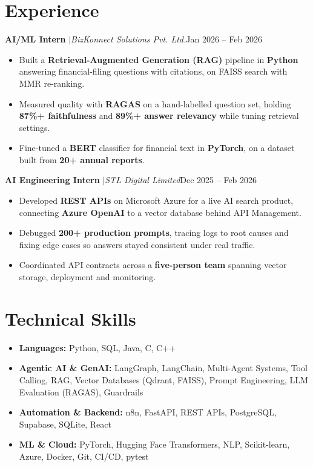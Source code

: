 \documentclass[a4paper,10pt]{article}
\newcommand{\entrygap}{\vspace{4pt}}
\newcommand{\sep}{\unskip\hspace{0.5em}$|$\hspace{0.5em}\ignorespaces}
\newlength{\entryindent}\setlength{\entryindent}{10pt}
\newcommand{\entry}[2]{\hspace*{\entryindent}#1\hfill #2\par}
\begin{document}

\section*{Experience}

\entry{\textbf{AI/ML Intern} \sep \textit{BizKonnect Solutions Pvt. Ltd.}}{Jan 2026 -- Feb 2026}
\begin{itemize}
    \item Built a \textbf{Retrieval-Augmented Generation (RAG)} pipeline in \textbf{Python} answering financial-filing questions with citations, on FAISS search with MMR re-ranking.
    \item Measured quality with \textbf{RAGAS} on a hand-labelled question set, holding \textbf{87\%+ faithfulness} and \textbf{89\%+ answer relevancy} while tuning retrieval settings.
    \item Fine-tuned a \textbf{BERT} classifier for financial text in \textbf{PyTorch}, on a dataset built from \textbf{20+ annual reports}.
\end{itemize}
\entrygap
\entry{\textbf{AI Engineering Intern} \sep \textit{STL Digital Limited}}{Dec 2025 -- Feb 2026}
\begin{itemize}
    \item Developed \textbf{REST APIs} on Microsoft Azure for a live AI search product, connecting \textbf{Azure OpenAI} to a vector database behind API Management.
    \item Debugged \textbf{200+ production prompts}, tracing logs to root causes and fixing edge cases so answers stayed consistent under real traffic.
    \item Coordinated API contracts across a \textbf{five-person team} spanning vector storage, deployment and monitoring.
\end{itemize}


\section*{Technical Skills}
\begin{itemize}[leftmargin=10pt,label={},itemsep=4pt,topsep=2pt]
\item \textbf{Languages:} Python, SQL, Java, C, C++
\item \textbf{Agentic AI \& GenAI:} LangGraph, LangChain, Multi-Agent Systems, Tool Calling, RAG, Vector Databases (Qdrant, FAISS), Prompt Engineering, LLM Evaluation (RAGAS), Guardrails
\item \textbf{Automation \& Backend:} n8n, FastAPI, REST APIs, PostgreSQL, Supabase, SQLite, React
\item \textbf{ML \& Cloud:} PyTorch, Hugging Face Transformers, NLP, Scikit-learn, Azure, Docker, Git, CI/CD, pytest
\end{itemize}
\end{document}
